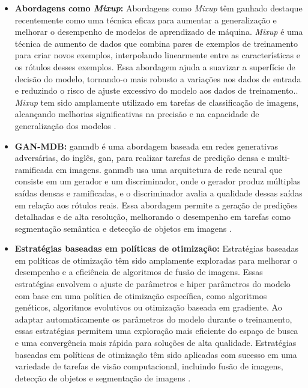 \begin{itemize}
    \item \textbf{Abordagens como \textit{Mixup}:} Abordagens como \textit{Mixup} têm ganhado destaque recentemente como uma técnica eficaz para aumentar a generalização e melhorar o desempenho de modelos de aprendizado de máquina. \textit{Mixup} é uma técnica de aumento de dados que combina pares de exemplos de treinamento para criar novos exemplos, interpolando linearmente entre as características e os rótulos desses exemplos. Essa abordagem ajuda a suavizar a superfície de decisão do modelo, tornando-o mais robusto a variações nos dados de entrada e reduzindo o risco de ajuste excessivo do modelo aos dados de treinamento.. \textit{Mixup} tem sido amplamente utilizado em tarefas de classificação de imagens, alcançando melhorias significativas na precisão e na capacidade de generalização dos modelos \cite{zhang2017mixup}.
    \item \textbf{GAN-MDB: }\gls{ganmdb} é uma abordagem baseada em redes generativas adversárias, do inglês,  \gls{gan}, para realizar tarefas de predição densa e multi-ramificada em imagens. \gls{ganmdb} usa uma arquitetura de rede neural que consiste em um gerador e um discriminador, onde o gerador produz múltiplas saídas densas e ramificadas, e o discriminador avalia a qualidade dessas saídas em relação aos rótulos reais. Essa abordagem permite a geração de predições detalhadas e de alta resolução, melhorando o desempenho em tarefas como segmentação semântica e detecção de objetos em imagens \cite{fan2019ganmbd}.
    \item \textbf{Estratégias baseadas em políticas de otimização:} Estratégias baseadas em políticas de otimização têm sido amplamente exploradas para melhorar o desempenho e a eficiência de algoritmos de fusão de imagens. Essas estratégias envolvem o ajuste de parâmetros e hiper parâmetros do modelo com base em uma política de otimização específica, como algoritmos genéticos, algoritmos evolutivos ou otimização baseada em gradiente. Ao adaptar automaticamente os parâmetros do modelo durante o treinamento, essas estratégias permitem uma exploração mais eficiente do espaço de busca e uma convergência mais rápida para soluções de alta qualidade. Estratégias baseadas em políticas de otimização têm sido aplicadas com sucesso em uma variedade de tarefas de visão computacional, incluindo fusão de imagens, detecção de objetos e segmentação de imagens \cite{pmlr-v119-tian20a}.
\end{itemize}


